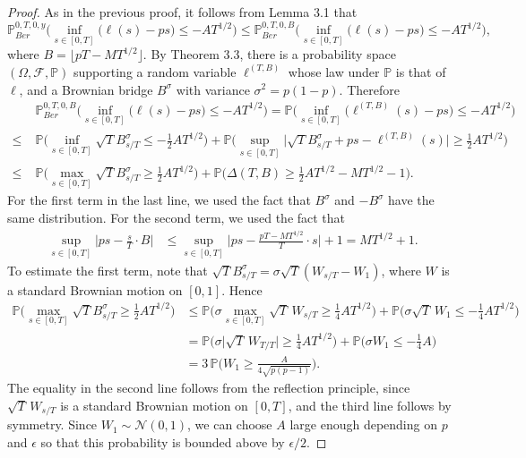 \documentclass[12pt]{article}
\begin{document}
\begin{proof}
		As in the previous proof, it follows from Lemma 3.1 that
		\[
		\mathbb{P}^{0,T,0,y}_{Ber}\Big( \inf_{s \in [ 0, T]}\big( \ell(s) -  ps \big) \leq -AT^{1/2} \Big) \leq \mathbb{P}^{0,T,0,B}_{Ber}\Big( \inf_{s \in [ 0, T]}\big( \ell(s) -  ps \big) \leq -AT^{1/2} \Big),
		\]
		where $B=\lfloor pT - MT^{1/2}\rfloor$. By Theorem 3.3, there is a probability space $(\Omega,\mathcal{F},\mathbb{P})$ supporting a random variable $\ell^{(T,B)}$ whose law under $\mathbb{P}$ is that of $\ell$, and a Brownian bridge $B^\sigma$ with variance $\sigma^2 = p(1-p)$. Therefore
		\begin{align*}
		&\mathbb{P}^{0,T,0,B}_{Ber}\Big( \inf_{s \in [ 0, T]}\big( \ell(s) -  ps \big) \leq -AT^{1/2} \Big) = \mathbb{P}\Big( \inf_{s \in [ 0, T]}\big( \ell^{(T,B)}(s) -  ps \big) \leq -AT^{1/2} \Big)\\
		\leq \; & \mathbb{P}\Big( \inf_{s \in [ 0, T]}  \sqrt{T}B^\sigma_{s/T} \leq -\frac{1}{2}AT^{1/2} \Big) + \mathbb{P}\Big( \sup_{s\in [0,T]} \Big|\sqrt{T} B^\sigma_{s/T} + ps - \ell^{(T,B)}(s) \Big| \geq \frac{1}{2}AT^{1/2} \Big)\\
		\leq \; & \mathbb{P}\Big( \max_{s\in[0,T]} \sqrt{T}B^\sigma_{s/T} \geq \frac{1}{2}AT^{1/2} \Big) + \mathbb{P}\Big(\Delta(T,B) \geq \frac{1}{2}AT^{1/2} - MT^{1/2} - 1\Big).
		\end{align*}
		For the first term in the last line, we used the fact that $B^\sigma$ and $-B^\sigma$ have the same distribution. For the second term, we used the fact that
		\begin{align*}
		\sup_{s\in[0,T]}\Big| ps - \frac{s}{T}\cdot B \Big| &\leq \sup_{s\in[0,T]}\Big| ps - \frac{pT-MT^{1/2}}{T}\cdot s \Big| + 1 = MT^{1/2} + 1.
		\end{align*} To estimate the first term, note that $\sqrt{T}B^\sigma_{s/T} = \sigma\sqrt{T}(W_{s/T} - W_1)$, where $W$ is a standard Brownian motion on $[0,1]$. Hence
		\begin{align*}
		\mathbb{P}\Big( \max_{s\in[0,T]} \sqrt{T}B^\sigma_{s/T} \geq \frac{1}{2}AT^{1/2} \Big) &\leq \mathbb{P}\Big( \sigma\max_{s\in[0,T]} \sqrt{T}\,W_{s/T} \geq \frac{1}{4}AT^{1/2} \Big) + \mathbb{P}\Big( \sigma\sqrt{T}\,W_1 \leq -\frac{1}{4}AT^{1/2} \Big)\\
		&= \mathbb{P}\Big( \sigma\big|\sqrt{T}\,W_{T/T}\big| \geq \frac{1}{4}AT^{1/2} \Big) + \mathbb{P}\Big( \sigma W_1 \leq -\frac{1}{4}A \Big)\\
		&= 3\,\mathbb{P}\Big( W_1 \geq \frac{A}{4\sqrt{p(p-1)}} \Big).
		\end{align*} 
		The equality in the second line follows from the reflection principle, since $\sqrt{T}\,W_{s/T}$ is a standard Brownian motion on $[0,T]$, and the third line follows by symmetry. Since $W_1\sim\mathcal{N}(0,1)$, we can choose $A$ large enough depending on $p$ and $\epsilon$ so that this probability is bounded above by $\epsilon/2$. 
		

\end{proof}
\end{document}
